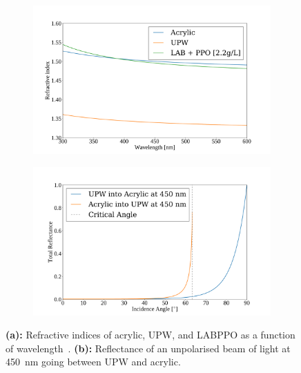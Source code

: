 \begin{figure}
    \centering
    \begin{subfigure}{0.48\textwidth}
        \centering
        \includegraphics[width=0.95\linewidth]{2_Detector/Figs/refractive_indices_plot.pdf}
        \caption{}
        \label{fig:ref_indices_snoplus}
    \end{subfigure}
    \begin{subfigure}{0.48\textwidth}
        \centering
        \includegraphics[width=0.95\linewidth]{2_Detector/Figs/reflectance_vs_angle_plot.pdf}
        \caption{}
        \label{fig:reflectance_vs_angle}
    \end{subfigure}
    \caption[Refractive indices of acrylic, UPW, and LABPPO as a function of wavelength; also reflectance as a function of incidence angle]
    {\textbf{(a):} Refractive indices of acrylic, UPW, and LABPPO as a function of wavelength~\cite{andersonOpticalCalibrationSNO2021,tseungEllipsometricMeasurementsRefractive2011,moffatOpticalCalibrationSudbury2001}. \textbf{(b):} Reflectance of an unpolarised beam of light at \SI{450}{\nm} going between UPW and acrylic.
    }
    \label{fig:ref_index_and_reflectance}
\end{figure}

